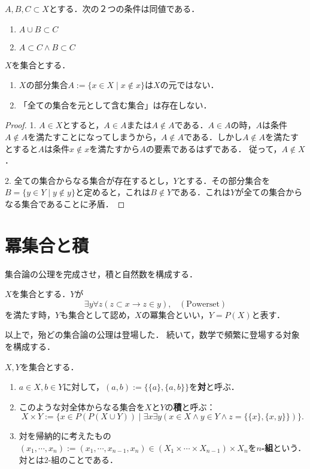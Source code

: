\documentclass[uplatex,dvipdfmx]{jsreport}
\begin{document}
\begin{proposition}$A,B,C\subset X$とする．次の２つの条件は同値である．
    \begin{enumerate}
        \item $A\cup B\subset C$
        \item $A\subset C\wedge B\subset C$
    \end{enumerate}
\end{proposition}

\begin{proposition}[Russellの逆理]
    $X$を集合とする．
    \begin{enumerate}
        \item $X$の部分集合$A:=\{x\in X\mid x\notin x\}$は$X$の元ではない．
        \item 「全ての集合を元として含む集合」は存在しない．
    \end{enumerate}
\end{proposition}
\begin{proof}
    1. $A\in X$とすると，$A\in A$または$A\notin A$である．$A\in A$の時，$A$は条件$A\notin A$を満たすことになってしまうから，$A\notin A$である．しかし$A\notin A$を満たすとすると$A$は条件$x\notin x$を満たすから$A$の要素であるはずである．
    従って，$A\notin X$．

    2. 全ての集合からなる集合が存在するとし，$Y$とする．その部分集合を$B=\{y\in Y\mid y\notin y\}$と定めると，これは$B\notin Y$である．これは$Y$が全ての集合からなる集合であることに矛盾．
\end{proof}

\section{冪集合と積}

\begin{screen}
    集合論の公理を完成させ，積と自然数を構成する．
\end{screen}

\begin{axiom}[冪集合]
    $X$を集合とする．$Y$が
    \[\exists y\forall z(z\subset x\rightarrow z\in y),\;\;\;(\mathrm{Power set})\]
    を満たす時，$Y$も集合として認め，$X$の冪集合といい，$Y=P(X)$と表す．
\end{axiom}

以上で，殆どの集合論の公理は登場した．
続いて，数学で頻繁に登場する対象を構成する．

\begin{definition}[積]
    $X,Y$を集合とする．
    \begin{enumerate}
        \item $a\in X,b\in Y$に対して，$(a,b):=\{\{a\},\{a,b\}\}$を\textbf{対}と呼ぶ．
        \item このような対全体からなる集合を$X$と$Y$の\textbf{積}と呼ぶ：
        \[ X\times Y:=\{x\in P(P(X\cup Y))\mid \exists x\exists y(x\in X\land y\in Y\land z=\{\{x\},\{x,y\}\})\}. \]
        \item 対を帰納的に考えたもの$(x_1,\cdots,x_n):=(x_1,\cdots,x_{n-1},x_n)\in( X_1\times\cdots\times X_{n-1})\times X_n$を\textbf{$n$-組}という．対とは2-組のことである．
    \end{enumerate}
\end{definition}
\end{document}
